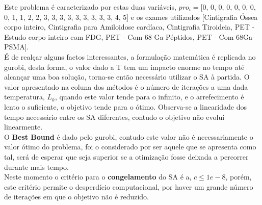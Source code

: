 Este problema é caracterizado por estas duas variáveis, $pro_i = $[0, 0, 0, 0, 0, 0, 0, 0, 1, 1, 2, 2, 3, 3, 3, 3, 3, 3, 3, 3, 3, 4, 5] e os exames utilizados [Cintigrafia Óssea corpo inteiro, Cintigrafia para Amiloidose cardíaca, Cintigrafia Tiroideia, PET - Estudo corpo inteiro com FDG, PET - Com 68 Ga-Péptidos, PET - Com 68Ga-PSMA].\\
É de realçar alguns factos interessantes, a formulação matemática é replicada no gurobi, desta forma, o valor dado a T tem um impacto enorme no tempo até alcançar uma boa solução, torna-se então necessário utilizar o SA à partida. O valor apresentado na coluna dos métodos é o número de iterações a uma dada temperatura, $L_{k}$, quando este valor tende para o infinito, e o arrefecimento é  lento o suficiente, o objetivo tende para o ótimo. Observa-se a linearidade dos tempo necessário entre os SA diferentes, contudo o objetivo não evoluí linearmente.\\
O \textbf{Best Bound} é dado pelo gurobi, contudo este valor não é necessariamente o valor ótimo do problema, foi o considerado por ser aquele que se apresenta como tal, será de esperar que seja superior se a otimização fosse deixada a percorrer durante mais tempo.\\
Neste momento o critério para o \textbf{congelamento} do SA é a, $c \leq 1e-8$, porém, este critério permite o desperdício computacional, por haver um grande número de iterações em que o objetivo não é reduzido.





